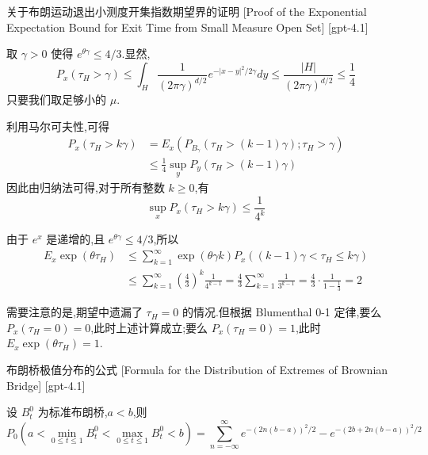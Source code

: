 \documentclass[UTF8]{ctexart}
\begin{document}
    
    
    \begin{prf}
        {关于布朗运动退出小测度开集指数期望界的证明}
        [Proof of the Exponential Expectation Bound for Exit Time from Small Measure Open Set]
        [gpt-4.1]
        
取 $\gamma > 0$ 使得 $e^{\theta \gamma} \leq 4/3$.显然,
\[
P_{x}( \tau_{H} > \gamma ) \leq \int_{H} \frac{1}{(2\pi \gamma)^{d/2}} e^{ - |x - y|^{2} / 2\gamma } d y \leq \frac{ |H| }{ (2\pi \gamma)^{d/2} } \leq \frac{1}{4}
\]
只要我们取足够小的 $\mu$.

利用马尔可夫性,可得
\[
\begin{aligned}
P_{x}( \tau_{H} > k \gamma ) &= E_{x} \left( P_{ B_{\gamma} } ( \tau_{H} > (k-1)\gamma ) ; \tau_{H} > \gamma \right) \\
&\leq \frac{1}{4} \sup_{y} P_{y}( \tau_{H} > (k-1)\gamma )
\end{aligned}
\]
因此由归纳法可得,对于所有整数 $k \geq 0$,有
\[
\sup_{x} P_{x}( \tau_{H} > k \gamma ) \leq \frac{1}{4^{k}}
\]

由于 $e^{x}$ 是递增的,且 $e^{\theta \gamma} \leq 4/3$,所以
\[
\begin{aligned}
E_{x} \exp( \theta \tau_{H} ) &\leq \sum_{k=1}^{\infty} \exp( \theta \gamma k ) P_{x}( (k-1)\gamma < \tau_{H} \leq k\gamma ) \\
&\leq \sum_{k=1}^{\infty} \left( \frac{4}{3} \right)^{k} \frac{1}{4^{k-1}} = \frac{4}{3} \sum_{k=1}^{\infty} \frac{1}{3^{k-1}} = \frac{4}{3} \cdot \frac{1}{1 - \frac{1}{3}} = 2
\end{aligned}
\]

需要注意的是,期望中遗漏了 $\tau_{H}=0$ 的情况.但根据 Blumenthal 0-1 定律,要么 $P_{x}( \tau_{H}=0 ) = 0$,此时上述计算成立;要么 $P_{x}( \tau_{H}=0 ) = 1$,此时 $E_{x} \exp( \theta \tau_{H} ) = 1$.

    \end{prf}
    
    
    
    \begin{thm}
        {布朗桥极值分布的公式}
        [Formula for the Distribution of Extremes of Brownian Bridge]
        [gpt-4.1]
        
设 $B_t^0$ 为标准布朗桥,$a < b$,则
\[
P_{0}(a < \min_{0 \leq t \leq 1} B_{t}^{0} < \max_{0 \leq t \leq 1} B_{t}^{0} < b)
= \sum_{n=-\infty}^{\infty} e^{-(2n(b-a))^{2}/2} - e^{-(2b + 2n(b-a))^{2}/2}
\]

    \end{thm}
    
\end{document}
